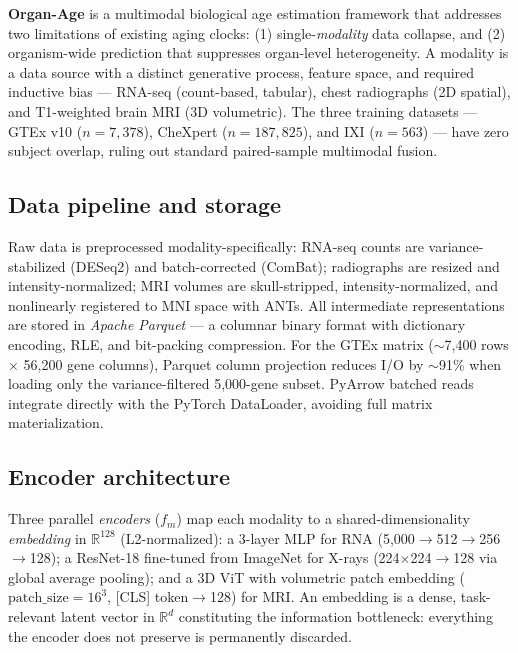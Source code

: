 \documentclass[11pt]{article}
\begin{document}
\begin{tcolorbox}[L3box]

\textbf{Organ-Age} is a multimodal biological age estimation framework that addresses two limitations of existing aging clocks: (1) single-\textit{modality} data collapse, and (2) organism-wide prediction that suppresses organ-level heterogeneity. A modality is a data source with a distinct generative process, feature space, and required inductive bias --- RNA-seq (count-based, tabular), chest radiographs (2D spatial), and T1-weighted brain MRI (3D volumetric). The three training datasets --- GTEx v10 ($n=7{,}378$), CheXpert ($n=187{,}825$), and IXI ($n=563$) --- have zero subject overlap, ruling out standard paired-sample multimodal fusion.

\subsection{Data pipeline and storage}

Raw data is preprocessed modality-specifically: RNA-seq counts are variance-stabilized (DESeq2) and batch-corrected (ComBat); radiographs are resized and intensity-normalized; MRI volumes are skull-stripped, intensity-normalized, and nonlinearly registered to MNI space with ANTs. All intermediate representations are stored in \textit{Apache Parquet} --- a columnar binary format with dictionary encoding, RLE, and bit-packing compression. For the GTEx matrix ($\sim$7,400 rows $\times$ 56,200 gene columns), Parquet column projection reduces I/O by $\sim$91\% when loading only the variance-filtered 5,000-gene subset. PyArrow batched reads integrate directly with the PyTorch DataLoader, avoiding full matrix materialization.

\subsection{Encoder architecture}

Three parallel \textit{encoders} ($f_m$) map each modality to a shared-dimensionality \textit{embedding} in $\mathbb{R}^{128}$ (L2-normalized): a 3-layer MLP for RNA (5,000$\to$512$\to$256$\to$128); a ResNet-18 fine-tuned from ImageNet for X-rays (224$\times$224$\to$128 via global average pooling); and a 3D ViT with volumetric patch embedding ($\text{patch\_size}=16^3$, [CLS] token$\to$128) for MRI. An embedding is a dense, task-relevant latent vector in $\mathbb{R}^d$ constituting the information bottleneck: everything the encoder does not preserve is permanently discarded.


\end{tcolorbox}
\end{document}
